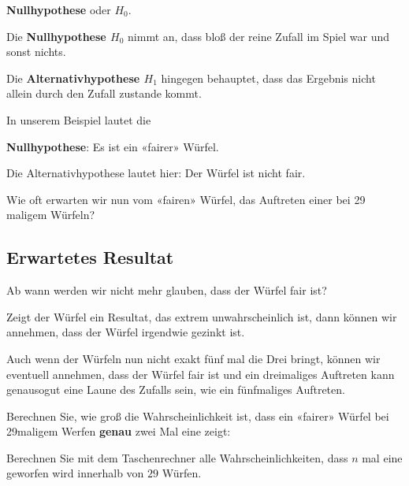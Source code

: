\begin{center}\textbf{Nullhypothese} oder {$H_0$}.\end{center}

Die \textbf{Nullhypothese $H_0$} nimmt an, dass bloß der reine Zufall
im Spiel war und sonst nichts.

Die \textbf{Alternativhypothese $H_1$} hingegen behauptet, dass das
Ergebnis nicht allein durch den Zufall zustande kommt.

In unserem Beispiel lautet die

\textbf{Nullhypothese}: Es ist ein «fairer» Würfel.

Die Alternativhypothese lautet hier: Der Würfel ist nicht fair.

Wie oft erwarten wir nun vom «fairen» Würfel, das Auftreten
einer  bei 29 maligem Würfeln?


\newpage
\subsection{Erwartetes Resultat}
Ab wann werden wir nicht mehr glauben, dass der Würfel fair ist?

Zeigt der Würfel ein Resultat, das extrem unwahrscheinlich ist, dann
können wir annehmen, dass der Würfel irgendwie gezinkt ist.

Auch wenn der Würfeln nun nicht exakt fünf mal die Drei bringt, können
wir eventuell annehmen, dass der Würfel fair ist und ein dreimaliges
Auftreten kann genausogut eine Laune des Zufalls sein, wie ein
fünfmaliges Auftreten.

Berechnen Sie, wie groß die Wahrscheinlichkeit ist, dass ein «fairer»
Würfel bei 29maligem Werfen \textbf{genau} zwei Mal eine 
zeigt:

\newpage
Berechnen Sie mit dem Taschenrechner alle Wahrscheinlichkeiten, dass
$n$ mal eine  geworfen wird innerhalb von $29$ Würfen.

